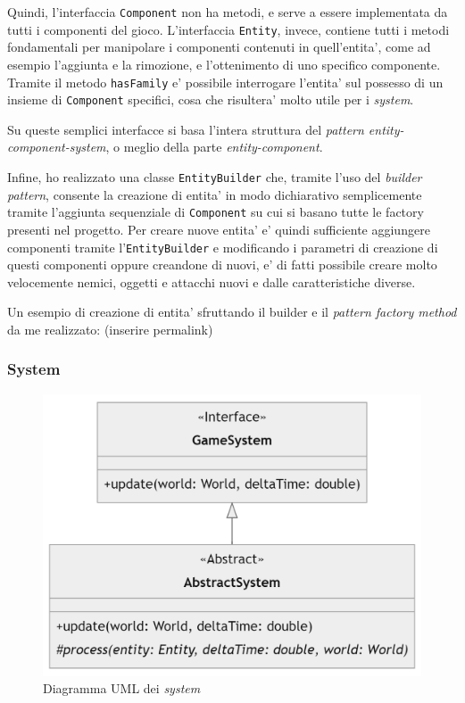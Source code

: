 \documentclass[a4paper,12pt]{report}
\begin{document}
Quindi, l'interfaccia \texttt{Component} non ha metodi, e serve a essere implementata da tutti i componenti del gioco.
L'interfaccia \texttt{Entity}, invece, contiene tutti i metodi fondamentali per manipolare i componenti contenuti in quell'entita', come ad esempio l'aggiunta e la rimozione, e l'ottenimento di uno specifico componente. Tramite il metodo \texttt{hasFamily} e' possibile interrogare l'entita' sul possesso di un insieme di \texttt{Component} specifici, cosa che risultera' molto utile per i \textit{system}.

Su queste semplici interfacce si basa l'intera struttura del \textit{pattern entity-component-system}, o meglio della parte \textit{entity-component}.

Infine, ho realizzato una classe \texttt{EntityBuilder} che, tramite l'uso del \textit{builder pattern}, consente la creazione di entita' in modo dichiarativo semplicemente tramite l'aggiunta sequenziale di \texttt{Component} su cui si basano tutte le factory presenti nel progetto. Per creare nuove entita' e' quindi sufficiente aggiungere componenti tramite l'\texttt{EntityBuilder} e modificando i parametri di creazione di questi componenti oppure creandone di nuovi, e' di fatti possibile creare molto velocemente nemici, oggetti e attacchi nuovi e dalle caratteristiche diverse.

Un esempio di creazione di entita' sfruttando il builder e il \textit{pattern factory method} da me realizzato: (inserire permalink)

\subsubsection{System}

\begin{figure}[h]
	\centering
	\includegraphics[width=\textwidth]{uml/uml_system.png}
	\caption{Diagramma UML dei \textit{system}} 
\end{figure}
\end{document}
